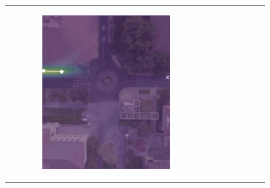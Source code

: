 \documentclass[conference]{IEEEtran}
\begin{document}
\begin{figure}
	\centering
	\begin{tabular}{M{.1\linewidth}  M{.3\linewidth} M{.3\linewidth}  M{.3\linewidth}} 

	  & \begin{subfigure}[b]{\linewidth}
		\includegraphics[width=\linewidth]{./figures/comparison/ours_death_1_2_t=70.png}
	\end{subfigure} &
	\begin{subfigure}[b]{\linewidth}

\end{subfigure}
\end{tabular}
\end{figure}
\end{document}
